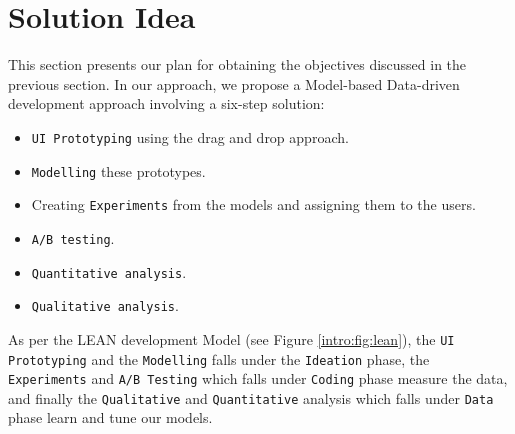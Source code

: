 \chapter{Solution Idea} \label{chap:solutionideas}

This section presents our plan for obtaining the objectives discussed in the previous section. 
In our approach, we propose a Model-based Data-driven development approach involving a six-step solution:
\begin{itemize}
	\item \texttt{UI Prototyping} using the drag and drop approach.
	\item \texttt{Modelling} these prototypes.
	\item Creating \texttt{Experiments} from the models and assigning them to the users. 
	\item \texttt{A/B testing}.
	\item \texttt{Quantitative analysis}. 
	\item \texttt{Qualitative analysis}. 
\end{itemize}
As per the LEAN development Model (see Figure \ref{intro:fig:lean}), the \texttt{UI Prototyping} and the \texttt{Modelling} falls under the \texttt{Ideation} phase, the \texttt{Experiments} and \texttt{A/B Testing} which falls under \texttt{Coding} phase measure the data, and finally the \texttt{Qualitative} and \texttt{Quantitative} analysis which falls under \texttt{Data} phase learn and tune our models.

